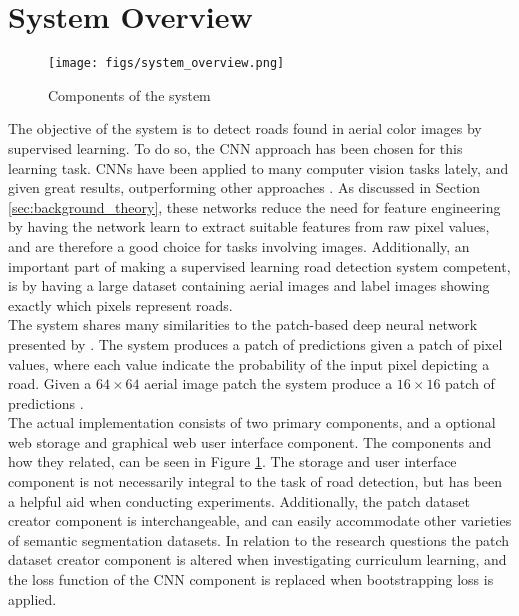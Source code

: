 \section{System Overview}
\label{sec:systemOverview}
\begin{figure}[t]
\begin{center}
\texttt{[image: figs/system\_overview.png]}
\caption[Components of the system]{Components of the system}
\label{fig:system_components}
\end{center}
\end{figure}

The objective of the system is to detect roads found in aerial color images by supervised learning. To do so, the \ac{CNN} approach has been chosen for this learning task. \ac{CNN}s have been applied to many computer vision tasks lately, and given great results, outperforming other approaches \citep{Krizhevsky_imagenet} . As discussed in Section \ref{sec:background_theory}, these networks reduce the need for feature engineering by having the network learn to extract suitable features from raw pixel values, and are therefore a good choice for tasks involving images. Additionally, an important part of making a supervised learning road detection system competent, is by having a large dataset containing aerial images and label images showing exactly which pixels represent roads.\\


The system shares many similarities to the patch-based deep neural network presented by \cite{Mnih_aerial_images_noisy}. The system produces a patch of predictions given a patch of pixel values, where each value indicate the probability of the input pixel depicting a road. Given a $64 \times 64$ aerial image patch the system produce a $16 \times 16$ patch of predictions .\\


The actual implementation consists of two primary components, and a optional web storage and graphical web user interface component. The components and how they related, can be seen in Figure \ref{fig:system_components}. The storage and user interface component is not necessarily  integral to the task of road detection, but has been a helpful aid when conducting experiments. Additionally, the patch dataset creator component is interchangeable, and can easily accommodate other varieties of semantic segmentation datasets. In relation to the research questions the patch dataset creator component is altered when investigating curriculum learning, and the loss function of the \ac{CNN} component is replaced when bootstrapping loss is applied. \\


